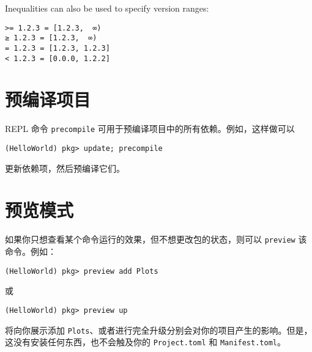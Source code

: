 Inequalities can also be used to specify version ranges:




\begin{lstlisting}
>= 1.2.3 = [1.2.3,  ∞)
≥ 1.2.3 = [1.2.3,  ∞)
= 1.2.3 = [1.2.3, 1.2.3]
< 1.2.3 = [0.0.0, 1.2.2]
\end{lstlisting}



\hypertarget{11268172833265643313}{}


\section{预编译项目}



REPL 命令 \texttt{precompile} 可用于预编译项目中的所有依赖。例如，这样做可以




\begin{lstlisting}
(HelloWorld) pkg> update; precompile
\end{lstlisting}



更新依赖项，然后预编译它们。



\hypertarget{1315229974566698548}{}


\section{预览模式}



如果你只想查看某个命令运行的效果，但不想更改包的状态，则可以 \texttt{preview} 该命令。例如：




\begin{lstlisting}
(HelloWorld) pkg> preview add Plots
\end{lstlisting}



或




\begin{lstlisting}
(HelloWorld) pkg> preview up
\end{lstlisting}



将向你展示添加 \texttt{Plots}、或者进行完全升级分别会对你的项目产生的影响。但是，这没有安装任何东西，也不会触及你的 \texttt{Project.toml} 和 \texttt{Manifest.toml}。




